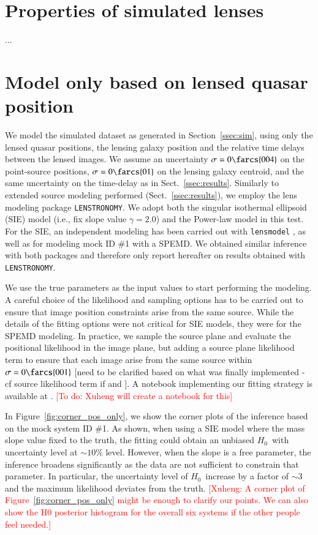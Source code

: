 \documentclass[traditabstract, twocolumns, longauth]{aa}
\newcommand{\LENSTRO}{{\tt LENSTRONOMY}}
\newcommand{\Hc}{\ensuremath{H_0}\xspace}
\begin{document}
\begin{appendix}
\onecolumn
\section{Properties of simulated lenses}
...

\section{Model only based on lensed quasar position}\label{app:simple_model}

We model the simulated dataset as generated in Section~\ref{ssec:sim}, using only the lensed quasar positions, the lensing galaxy position and the relative time delays between the lensed images. We assume an uncertainty $\sigma = 0\farcs{004}$ on the point-source positions, $\sigma = 0\farcs{01}$ on the lensing galaxy centroid, and the same uncertainty on the time-delay as in Sect.~\ref{ssec:results}. Similarly to extended source modeling performed (Sect.~\ref{ssec:results}), we employ the lens modeling package \LENSTRO. We adopt both the singular isothermal ellipsoid (SIE) model (i.e., fix slope value $\gamma=2.0$) and the Power-law model in this test. For the SIE, an independent modeling has been carried out with \texttt{lensmodel} \citep{Keeton2001, Keeton2011}, as well as for modeling mock ID \#1 with a SPEMD. We obtained similar inference with both packages and therefore only report hereafter on results obtained with \LENSTRO.  

We use the true parameters as the input values to start performing the modeling. A careful choice of the likelihood and sampling options has to be carried out to ensure that image position constraints arise from the same source. While the details of the fitting options were not critical for SIE models, they were for the SPEMD modeling. In practice, we sample the source plane and evaluate the positional likelihood in the image plane, but adding a source plane likelihood term to ensure that each image arise from the same source within $\sigma = 0\farcs{001}$  [need to be clarified based on what was finally implemented - cf source likelihood term if and ]. A notebook implementing our fitting strategy is available at {\url{}}. \textcolor{red}{[To do: Xuheng will create a notebook for this]}

In Figure~\ref{fig:corner_pos_only}, we show the corner plots of the inference based on the mock system ID \#1. As shown, when using a SIE model where the mass slope value fixed to the truth, the fitting could obtain an unbiased \Hc\ with uncertainty level at $\sim10\%$ level. However, when the slope is a free parameter, the inference broadens significantly as the data are not sufficient to constrain that parameter. In particular, the uncertainty level of \Hc\ increase by a factor of $\sim3$ and the maximum likelihood deviates from the truth.
\textcolor{red}{[Xuheng: A corner plot of Figure~\ref{fig:corner_pos_only} might be enough to clarify our points. We can also show the H0 posterior histogram for the overall six systems if the other people feel needed.]}


\end{appendix}
\end{document}
